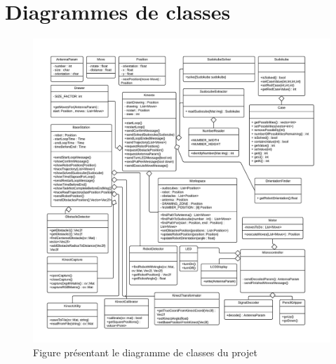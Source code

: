 

\chapter{Diagrammes de classes}
	\label{s:classes}
	\addtolength{\evensidemargin}{-1in}	

\begin{figure}[htbp]
\centering
\label{fig:DiagrammeClasse}
\includegraphics[scale=0.65]{fig/class_diagram.pdf}
\caption{Figure présentant le diagramme de classes du projet}
\end{figure}
